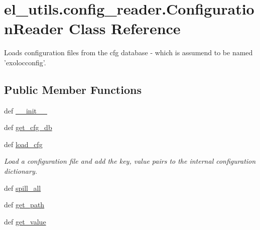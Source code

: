 \hypertarget{classel__utils_1_1config__reader_1_1ConfigurationReader}{\section{el\-\_\-utils.\-config\-\_\-reader.\-Configuration\-Reader Class Reference}
\label{classel__utils_1_1config__reader_1_1ConfigurationReader}
}


Loads configuration files from the cfg database -\/ which is assumend to be named 'exolocconfig'.  


\subsection*{Public Member Functions}
\begin{DoxyCompactItemize}
\item 
def \hyperlink{classel__utils_1_1config__reader_1_1ConfigurationReader_a8c1205d168b6de542dd1b40ebd2a358e}{\-\_\-\-\_\-init\-\_\-\-\_\-}
\item 
def \hyperlink{classel__utils_1_1config__reader_1_1ConfigurationReader_a52652afac126ef0854ff8842bb72bcf1}{get\-\_\-cfg\-\_\-db}
\item 
def \hyperlink{classel__utils_1_1config__reader_1_1ConfigurationReader_a96bfeb84d77e45d402b60bc1d497a973}{load\-\_\-cfg}
\begin{DoxyCompactList}\small\item\em Load a configuration file and add the key, value pairs to the internal configuration dictionary. \end{DoxyCompactList}\item 
def \hyperlink{classel__utils_1_1config__reader_1_1ConfigurationReader_a947f4ac1426b820f38d95a83f1270a1d}{spill\-\_\-all}
\item 
def \hyperlink{classel__utils_1_1config__reader_1_1ConfigurationReader_aad8349727d3ee0b3b5f8184401932625}{get\-\_\-path}
\item 
def \hyperlink{classel__utils_1_1config__reader_1_1ConfigurationReader_a4268336dae4d6a9031b1d71959396193}{get\-\_\-value}
\end{DoxyCompactItemize}
